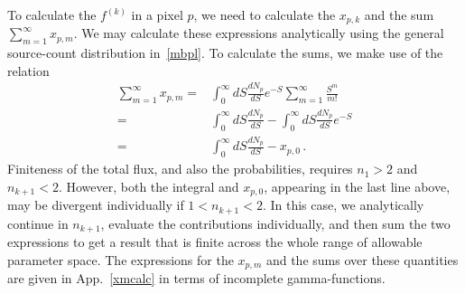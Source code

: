 To calculate the $f^{(k)}$ in a pixel $p$, we need to calculate the $x_{p,k}$ and the sum $\sum_{m=1}^\infty x_{p,m}$.  We may calculate these expressions analytically using the general source-count distribution in~\eqref{mbpl}.  To calculate the sums, we make use of the relation 
\begin{equation}\begin{aligned}
\sum_{m=1}^{\infty} x_{p,m} = &\int_0^{\infty} dS \frac{dN_p}{dS} e^{-S} \sum_{m=1}^{\infty} \frac{S^m}{m!} \\
= &\int_0^{\infty} dS \frac{dN_p}{dS} - \int_0^{\infty} dS \frac{dN_p}{dS} e^{-S} \\
= &\int_0^{\infty} dS \frac{dN_p}{dS} - x_{p,0}\,.
\end{aligned}
\label{eq:xmsum}
\end{equation}
Finiteness of the total flux, and also the probabilities, requires $n_1 > 2$ and $n_{k+1} < 2$.  However,  
both the integral and $x_{p,0}$, appearing in the last line above, may be divergent individually if $1 < n_{k+1} < 2$.  In this case, we analytically continue in $n_{k+1}$, evaluate the contributions individually, and then sum the two expressions to get a result that is finite across the whole range of allowable parameter space.  The expressions for the $x_{p,m}$ and the sums over these quantities are given in App.~\ref{xmcalc} in terms of incomplete gamma-functions.





